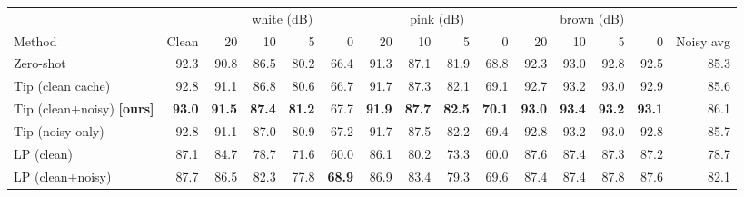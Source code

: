 \begin{tabular}{lrrrrrrrrrrrrrr}
\toprule
 & & \multicolumn{4}{c}{white (dB)} & \multicolumn{4}{c}{pink (dB)} & \multicolumn{4}{c}{brown (dB)} & \\
Method & Clean & 20 & 10 & 5 & 0 & 20 & 10 & 5 & 0 & 20 & 10 & 5 & 0 & Noisy avg \\
\midrule
Zero-shot & 92.3 & 90.8 & 86.5 & 80.2 & 66.4 & 91.3 & 87.1 & 81.9 & 68.8 & 92.3 & 93.0 & 92.8 & 92.5 & 85.3 \\
Tip (clean cache) & 92.8 & 91.1 & 86.8 & 80.6 & 66.7 & 91.7 & 87.3 & 82.1 & 69.1 & 92.7 & 93.2 & 93.0 & 92.9 & 85.6 \\
Tip (clean+noisy) \textbf{[ours]} & \textbf{93.0} & \textbf{91.5} & \textbf{87.4} & \textbf{81.2} & 67.7 & \textbf{91.9} & \textbf{87.7} & \textbf{82.5} & \textbf{70.1} & \textbf{93.0} & \textbf{93.4} & \textbf{93.2} & \textbf{93.1} & 86.1 \\
Tip (noisy only) & 92.8 & 91.1 & 87.0 & 80.9 & 67.2 & 91.7 & 87.5 & 82.2 & 69.4 & 92.8 & 93.2 & 93.0 & 92.8 & 85.7 \\
LP (clean) & 87.1 & 84.7 & 78.7 & 71.6 & 60.0 & 86.1 & 80.2 & 73.3 & 60.0 & 87.6 & 87.4 & 87.3 & 87.2 & 78.7 \\
LP (clean+noisy) & 87.7 & 86.5 & 82.3 & 77.8 & \textbf{68.9} & 86.9 & 83.4 & 79.3 & 69.6 & 87.4 & 87.4 & 87.8 & 87.6 & 82.1 \\
\bottomrule
\end{tabular}